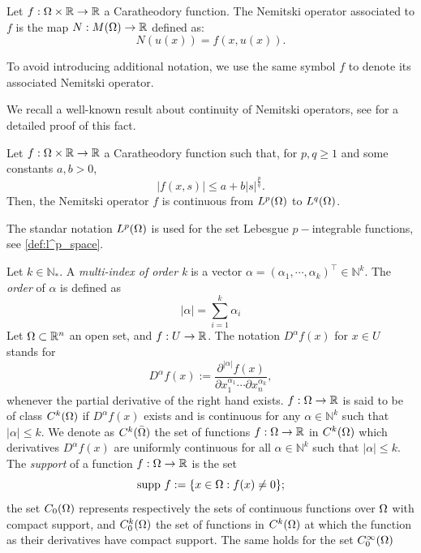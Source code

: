 \begin{definition}
    Let $f:\Omega\times \mathbb{R}\to \mathbb{R}$ a Caratheodory function. The Nemitski operator associated to $f$ is the map $N: M(\Omega)\to \mathbb{R}$ defined as:
    \[
    N(u(x))=f(x,u(x)).
    \]
\end{definition}
To avoid introducing additional notation, we use the same symbol $f$ to denote its associated Nemitski operator.

We recall a well-known result about continuity of Nemitski operators, see \cite{ambrosetti} for a detailed proof of this fact.

\begin{theorem}\label{thm:nemitski}
    Let $f:\Omega\times\mathbb{R}\to \mathbb{R}$ a Caratheodory function such that, for  $p, q\ge 1$ and some constants $a, b>0$,
    \[
    |f(x,s)|\le a + b|s|^{\frac{p}{q}}.
    \]
    Then, the Nemitski operator $f$ is continuous from $L^p(\Omega)$ to $L^q(\Omega)$.
\end{theorem}
The standar notation $L^p(\Omega)$ is used for the set Lebesgue $p-$integrable functions, see \eqref{def:l^p_space}.  

Let $k\in \mathbb{N}_*$. A \textit{multi-index of order k} is a vector $\alpha=(\alpha_1,\cdots,\alpha_k)^{\top}\in \mathbb{N}^k$. The \textit{order} of $\alpha$ is defined as
\[
|\alpha|=\sum_{i=1}^k \alpha_i
\]
Let $\Omega\subset\mathbb{R}^n$ an open set, and $f:U\to \mathbb{R}$. The notation $D^\alpha f(x)$ for $x\in U$ stands for
\begin{equation}\label{def:weak_derivate}
D^\alpha f(x):=\frac{\partial^{|\alpha|}f(x)}{\partial x_1^{\alpha_1}\cdots\partial x_n^{\alpha_k}},
\end{equation}
whenever the partial derivative of the right hand exists. $f:\Omega\to\mathbb{R}$ is said to be of class $C^k(\Omega)$ if $D^{\alpha}f(x)$ exists and is continuous for any $\alpha\in\mathbb{N}^k$ such that $|\alpha|\le k$. We denote as $C^{k}(\bar {\Omega})$ the set of functions $f:\Omega\to \mathbb{R}$ in $C^{k}(\Omega)$ which derivatives $D^{\alpha} f(x)$ are uniformly continuous for all $\alpha\in\mathbb{N}^k$ such that $|\alpha|\le k$. The \textit{support} of a function $f:\Omega\to \mathbb{R}$ is the set $$\mbox{supp }f:=\{x\in \Omega: f(x)\ne 0\};$$the set $C_0(\Omega)$ represents respectively the sets of continuous functions over $\Omega$ with compact support, and $C^k_0(\Omega)$ the set of functions in $C^k(\Omega)$ at which the function as their derivatives have compact support. The same holds for the set $C^{\infty}_0(\Omega)$\\

